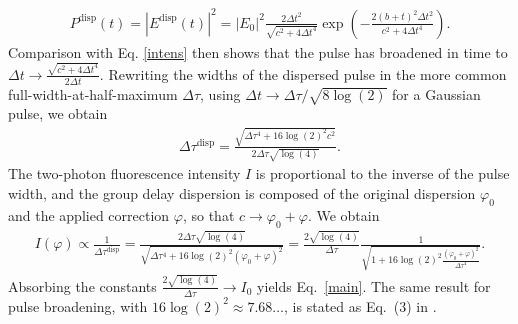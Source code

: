 \documentclass[10pt,letterpaper]{article}
\begin{document}
{\begin{eqnarray}
P^\text{disp}(t) = |E^\text{disp}(t)|^2 = |E_0|^2\frac{2\Delta t^2}{\sqrt{c^2 + 4\Delta t^4}}\exp\left(-\frac{2(b+t)^2\Delta t^2}{c^2+4\Delta t^4}\right)\label{intens_disp}.
\end{eqnarray}
Comparison with Eq. \eqref{intens} then shows that the pulse has broadened in time to $\Delta t\to \frac{\sqrt{c^2+4\Delta t^4}}{2\Delta t}$. Rewriting the widths of the dispersed pulse in the more common full-width-at-half-maximum $\Delta\tau$, using $\Delta t \to \Delta\tau/\sqrt{8\log(2)}$ for a Gaussian pulse, we obtain
\begin{eqnarray}
\Delta\tau^\text{disp} = \frac{\sqrt{\Delta\tau^4 + 16\log(2)^2c^2}}{2 \Delta\tau\sqrt{\log(4)}}.
\end{eqnarray}
The two-photon fluorescence intensity $I$ is proportional to the inverse of the pulse width, and the group delay dispersion is composed of the original dispersion $\varphi_0$ and the applied correction $\varphi$, so that $c \to \varphi_0 + \varphi$. We obtain
\begin{eqnarray}
I(\varphi) \propto \frac{1}{\Delta\tau^\text{disp}} = \frac{2 \Delta\tau\sqrt{\log(4)}}{\sqrt{\Delta\tau^4 + 16\log(2)^2(\varphi_0 + \varphi)^2}} = \frac{2\sqrt{\log(4)}}{\Delta\tau}\frac{1}{\sqrt{1 + 16\log(2)^2\frac{(\varphi_0 + \varphi)^2}{\Delta\tau^4}}}.
\end{eqnarray}
Absorbing the constants $\frac{2\sqrt{\log(4)}}{\Delta\tau}\to I_0$ yields Eq.~\eqref{main}. The same result for pulse broadening, with $16\log(2)^2\approx 7.68\dots$, is stated as Eq.~(3) in \cite{Zipfel2003}.
}

\nolinenumbers
\end{document}
